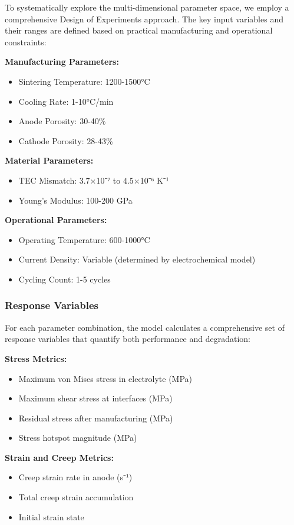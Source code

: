 \documentclass[conference]{IEEEtran}
\begin{document}
To systematically explore the multi-dimensional parameter space, we employ a comprehensive Design of Experiments approach. The key input variables and their ranges are defined based on practical manufacturing and operational constraints:

\textbf{Manufacturing Parameters:}
\begin{itemize}
\item Sintering Temperature: 1200-1500°C
\item Cooling Rate: 1-10°C/min
\item Anode Porosity: 30-40\%
\item Cathode Porosity: 28-43\%
\end{itemize}

\textbf{Material Parameters:}
\begin{itemize}
\item TEC Mismatch: 3.7×10⁻⁷ to 4.5×10⁻⁶ K⁻¹
\item Young's Modulus: 100-200 GPa
\end{itemize}

\textbf{Operational Parameters:}
\begin{itemize}
\item Operating Temperature: 600-1000°C
\item Current Density: Variable (determined by electrochemical model)
\item Cycling Count: 1-5 cycles
\end{itemize}

\subsubsection{Response Variables}

For each parameter combination, the model calculates a comprehensive set of response variables that quantify both performance and degradation:

\textbf{Stress Metrics:}
\begin{itemize}
\item Maximum von Mises stress in electrolyte (MPa)
\item Maximum shear stress at interfaces (MPa)
\item Residual stress after manufacturing (MPa)
\item Stress hotspot magnitude (MPa)
\end{itemize}

\textbf{Strain and Creep Metrics:}
\begin{itemize}
\item Creep strain rate in anode (s⁻¹)
\item Total creep strain accumulation
\item Initial strain state
\end{itemize}
\end{document}
